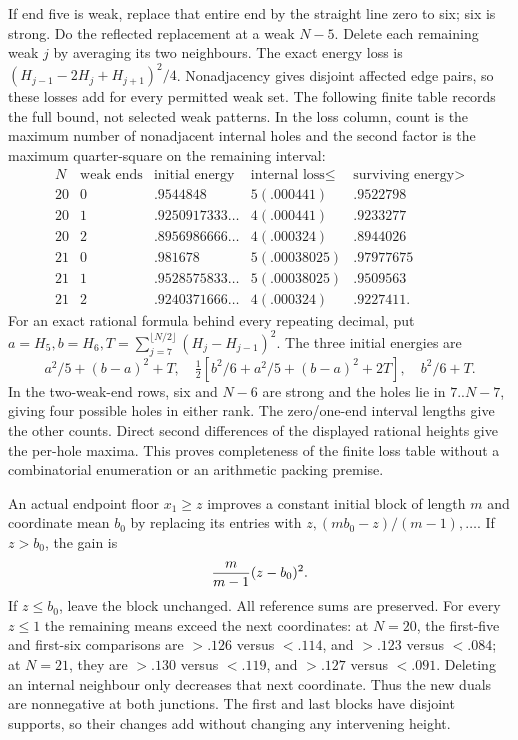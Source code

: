 \documentclass[11pt]{article}
\theoremstyle{definition}
\theoremstyle{remark}
\begin{document}
If end five is weak, replace that entire end by the straight line
zero to six; six is strong. Do the reflected replacement at a weak
$N-5$. Delete each remaining weak $j$ by averaging its two neighbours.
The exact energy loss is
$(H_{j-1}-2H_j+H_{j+1})^2/4$. Nonadjacency gives disjoint affected
edge pairs, so these losses add for every permitted weak set.
The following finite table records the full bound, not selected weak
patterns. In the loss column, count is the maximum number of
nonadjacent internal holes and the second factor is the maximum
quarter-square on the remaining interval:
\[
\begin{array}{c|c|c|c|c}
N&\text{weak ends}&\text{initial energy}&\text{internal loss}\le&
 \text{surviving energy}>\\\hline
20&0&.9544848&5(.000441)&.9522798\\
20&1&.9250917333\ldots&4(.000441)&.9233277\\
20&2&.8956986666\ldots&4(.000324)&.8944026\\
21&0&.981678&5(.00038025)&.97977675\\
21&1&.9528575833\ldots&5(.00038025)&.9509563\\
21&2&.9240371666\ldots&4(.000324)&.9227411 .
\end{array}
\]
For an exact rational formula behind every repeating decimal, put
$a=H_5,b=H_6,T=\sum_{j=7}^{\lfloor N/2\rfloor}(H_j-H_{j-1})^2$.
The three initial energies are
\[
 a^2/5+(b-a)^2+T,\quad
 \tfrac12[b^2/6+a^2/5+(b-a)^2+2T],\quad b^2/6+T.
\]
In the two-weak-end rows, six and $N-6$ are strong and the holes
lie in $7..N-7$, giving four possible holes in either rank.
The zero/one-end interval lengths give the other counts. Direct
second differences of the displayed rational heights give the
per-hole maxima. This proves completeness of the finite loss table
without a combinatorial enumeration or an arithmetic packing premise.

An actual endpoint floor $x_1\ge z$ improves a constant initial
block of length $m$ and coordinate mean $b_0$ by replacing its
entries with $z,(mb_0-z)/(m-1),\ldots$. If $z>b_0$, the gain is
\[
 {m\over m-1}(z-b_0)^2.
\]
If $z\le b_0$, leave the block unchanged. All reference sums are
preserved. For every $z\le1$ the remaining means exceed the next
coordinates: at $N=20$, the first-five and first-six comparisons
are $>.126$ versus $<.114$, and $>.123$ versus $<.084$;
at $N=21$, they are $>.130$ versus $<.119$, and $>.127$ versus
$<.091$. Deleting an internal neighbour only decreases that next
coordinate. Thus the new duals are nonnegative at both junctions.
The first and last blocks have disjoint supports, so their changes
add without changing any intervening height.
\end{document}
